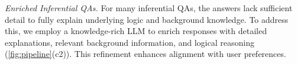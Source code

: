 
\textit{Enriched Inferential QAs. }
For many inferential QAs, 
the answers lack sufficient detail to fully explain underlying logic and background knowledge. 
To address this, we employ a knowledge-rich LLM to enrich responses with detailed explanations, relevant background information, and logical reasoning (\cref{fig:pipeline}(c2)). 
This refinement enhances alignment with user preferences.



